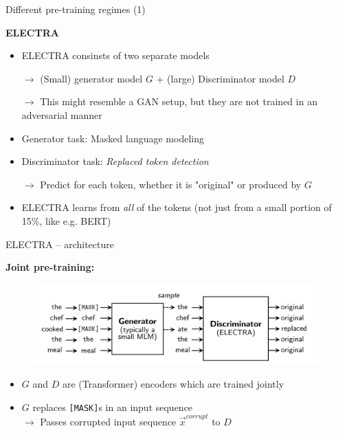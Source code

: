 \begin{frame}{Different pre-training regimes (1)}

\vfill

	\textbf{ELECTRA} 

	\begin{itemize}
		\item ELECTRA consinsts of two separate models
		\item[$\to$] (Small) generator model $G$ + (large) Discriminator model $D$
		\item[$\to$] This might resemble a GAN setup, but they are not trained in an adversarial manner
		\item Generator task: Masked language modeling
		\item Discriminator task: \textit{Replaced token detection}
		\item[$\to$] Predict for each token, whether it is "original" or produced by $G$
		\item ELECTRA learns from \textit{all} of the tokens (not just from a small portion of 15\%, like e.g. BERT)
	\end{itemize}
	
\vfill

\end{frame}


\begin{frame}{ELECTRA -- architecture}
	
\vfill

	\textbf{Joint pre-training:}
	
	\begin{figure}
		\centering
		\includegraphics[width = 11cm]{figure/electra.png}\\ 
	\end{figure}	
	
	\begin{itemize}
		\item $G$ and $D$ are (Transformer) encoders which are trained jointly
		\item $G$ replaces \texttt{[MASK]}s in an input sequence\\
					$\rightarrow$ Passes corrupted input sequence $\vec{x}^{corrupt}$ to $D$	
	\end{itemize}

\vfill

\end{frame}

